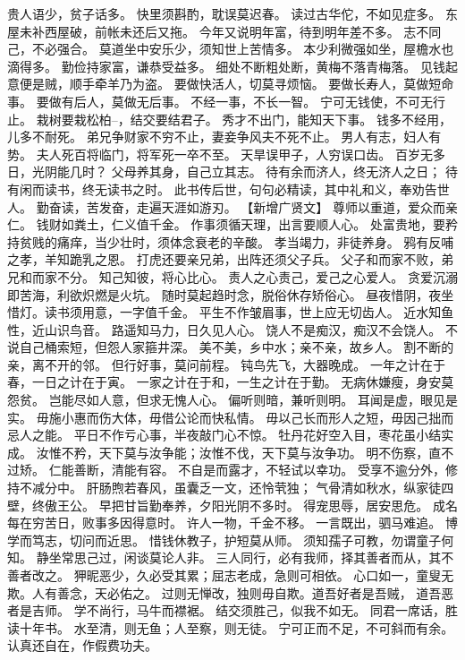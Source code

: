 \documentclass[12pt,UTF8]{ctexbook}
\begin{document}
贵人语少，贫子话多。
快里须斟酌，耽误莫迟春。
读过古华佗，不如见症多。
东屋未补西屋破，前帐未还后又拖。
今年又说明年富，待到明年差不多。
志不同己，不必强合。
莫道坐中安乐少，须知世上苦情多。
本少利微强如坐，屋檐水也滴得多。
勤俭持家富，谦恭受益多。
细处不断粗处断，黄梅不落青梅落。
见钱起意便是贼，顺手牵羊乃为盗。
要做快活人，切莫寻烦恼。
要做长寿人，莫做短命事。
要做有后人，莫做无后事。
不经一事，不长一智。
宁可无钱使，不可无行止。
栽树要栽松柏--，结交要结君子。
秀才不出门，能知天下事。
钱多不经用，儿多不耐死。
弟兄争财家不穷不止，妻妾争风夫不死不止。
男人有志，妇人有势。
夫人死百将临门，将军死一卒不至。
天旱误甲子，人穷误口齿。
百岁无多日，光阴能几时？
父母养其身，自己立其志。
待有余而济人，终无济人之日；
待有闲而读书，终无读书之时。
此书传后世，句句必精读，其中礼和义，奉劝告世人。
勤奋读，苦发奋，走遍天涯如游刃。
【新增广贤文】
尊师以重道，爱众而亲仁。
钱财如粪土，仁义值千金。
作事须循天理，出言要顺人心。
处富贵地，要矜持贫贱的痛痒，当少壮时，须体念衰老的辛酸。
孝当竭力，非徒养身。
鸦有反哺之孝，羊知跪乳之恩。
打虎还要亲兄弟，出阵还须父子兵。
父子和而家不败，弟兄和而家不分。
知己知彼，将心比心。
责人之心责己，爱己之心爱人。
贪爱沉溺即苦海，利欲炽燃是火坑。
随时莫起趋时念，脱俗休存矫俗心。
昼夜惜阴，夜坐惜灯。读书须用意，一字值千金。
平生不作皱眉事，世上应无切齿人。
近水知鱼性，近山识鸟音。
路遥知马力，日久见人心。
饶人不是痴汉，痴汉不会饶人。
不说自己桶索短，但怨人家箍井深。
美不美，乡中水；亲不亲，故乡人。
割不断的亲，离不开的邻。
但行好事，莫问前程。
钝鸟先飞，大器晚成。
一年之计在于春，一日之计在于寅。
一家之计在于和，一生之计在于勤。
无病休嫌瘦，身安莫怨贫。
岂能尽如人意，但求无愧人心。
偏听则暗，兼听则明。
耳闻是虚，眼见是实。
毋施小惠而伤大体，毋借公论而快私情。
毋以己长而形人之短，毋因己拙而忌人之能。
平日不作亏心事，半夜敲门心不惊。
牡丹花好空入目，枣花虽小结实成。
汝惟不矜，天下莫与汝争能；汝惟不伐，天下莫与汝争功。
明不伤察，直不过矫。
仁能善断，清能有容。
不自是而露才，不轻试以幸功。
受享不逾分外，修持不减分中。
肝肠煦若春风，虽囊乏一文，还怜茕独；
气骨清如秋水，纵家徒四壁，终傲王公。
早把甘旨勤奉养，夕阳光阴不多时。
得宠思辱，居安思危。
成名每在穷苦日，败事多因得意时。
许人一物，千金不移。
一言既出，驷马难追。
博学而笃志，切问而近思。
惜钱休教子，护短莫从师。
须知孺子可教，勿谓童子何知。
静坐常思己过，闲谈莫论人非。
三人同行，必有我师，择其善者而从，其不善者改之。
狎昵恶少，久必受其累；屈志老成，急则可相依。
心口如一，童叟无欺。人有善念，天必佑之。
过则无惮改，独则毋自欺。道吾好者是吾贼，
道吾恶者是吉师。
学不尚行，马牛而襟裾。
结交须胜己，似我不如无。
同君一席话，胜读十年书。
水至清，则无鱼；人至察，则无徒。
宁可正而不足，不可斜而有余。
认真还自在，作假费功夫。
\end{document}
